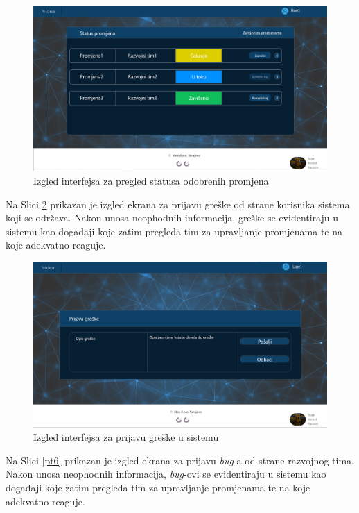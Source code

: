 \documentclass[12pt,a4paper]{article}
\begin{document}
\begin{figure}[H]
\center
\includegraphics[scale=0.4]{../res/Prototype/Status-promjene.PNG}
\caption{Izgled interfejsa za pregled statusa odobrenih promjena}
\label{pt4}
\end{figure}

\newpage

Na Slici \ref{pt5} prikazan je izgled ekrana za prijavu greške od strane korisnika sistema koji se održava. Nakon unosa neophodnih informacija, greške se evidentiraju u sistemu kao događaji koje zatim pregleda tim za upravljanje promjenama te na koje adekvatno reaguje.

\begin{figure}[H]
\center
\includegraphics[scale=0.4]{../res/Prototype/Greske.PNG}
\caption{Izgled interfejsa za prijavu greške u sistemu}
\label{pt5}
\end{figure}

Na Slici \ref{pt6} prikazan je izgled ekrana za prijavu \textit{bug}-a od strane razvojnog tima. Nakon unosa neophodnih informacija, \textit{bug}-ovi se evidentiraju u sistemu kao događaji koje zatim pregleda tim za upravljanje promjenama te na koje adekvatno reaguje.
\end{document}
